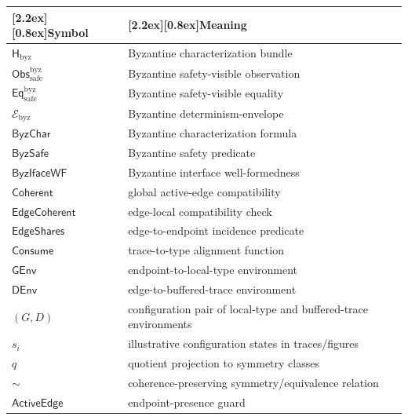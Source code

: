 \documentclass[a4paper,10pt,twocolumn,english]{article}
\numberwithin{equation}{section}
\theoremstyle{paperdef}
\theoremstyle{paperplain}
\theoremstyle{paperdef}
\theoremstyle{paperremark}
\newcommand{\thead}[1]{\textbf{\raisebox{0pt}[2.2ex][0.8ex]{#1}}}
\newcommand{\Coherent}{\ensuremath{\mathsf{Coherent}}}
\newcommand{\EdgeCoherent}{\ensuremath{\mathsf{EdgeCoherent}}}
\newcommand{\ActiveEdge}{\ensuremath{\mathsf{ActiveEdge}}}
\newcommand{\Consume}{\ensuremath{\mathsf{Consume}}}
\newcommand{\GEnv}{\ensuremath{\mathsf{GEnv}}}
\newcommand{\DEnv}{\ensuremath{\mathsf{DEnv}}}
\newcommand{\Hbyz}{\ensuremath{\mathsf{H}_{\mathrm{byz}}}}
\newcommand{\Obssafe}{\ensuremath{\mathsf{Obs}_{\mathrm{safe}}^{\mathrm{byz}}}}
\newcommand{\Eqsafe}{\ensuremath{\mathsf{Eq}_{\mathrm{safe}}^{\mathrm{byz}}}}
\newcommand{\Ebyz}{\ensuremath{\mathcal{E}_{\mathrm{byz}}}}
\newcommand{\ByzSafe}{\ensuremath{\mathsf{ByzSafe}}}
\newcommand{\ByzChar}{\ensuremath{\mathsf{ByzChar}}}
\newcommand{\EdgeShares}{\ensuremath{\mathsf{EdgeShares}}}
\newcommand{\ByzIfaceWF}{\ensuremath{\mathsf{ByzIfaceWF}}}
\begin{document}
\begin{center}
	\small
	\begin{tabularx}{\columnwidth}{@{}L{0.36\columnwidth}L{0.59\columnwidth}@{}}
		\toprule
		\thead{Symbol}  & \thead{Meaning}                                                  \\
		\midrule
		\Hbyz           & Byzantine characterization bundle                                \\
		\Obssafe        & Byzantine safety-visible observation                             \\
		\Eqsafe         & Byzantine safety-visible equality                                \\
		\Ebyz           & Byzantine determinism-envelope                                   \\
		\ByzChar        & Byzantine characterization formula                               \\
		\ByzSafe        & Byzantine safety predicate                                       \\
		\ByzIfaceWF     & Byzantine interface well-formedness                              \\
		\Coherent       & global active-edge compatibility                                 \\
		\EdgeCoherent   & edge-local compatibility check                                   \\
		\EdgeShares     & edge-to-endpoint incidence predicate                             \\
		\Consume        & trace-to-type alignment function                                 \\
		\GEnv           & endpoint-to-local-type environment                               \\
		\DEnv           & edge-to-buffered-trace environment                               \\
		$(G,D)$         & configuration pair of local-type and buffered-trace environments \\
		$s_i$           & illustrative configuration states in traces/figures              \\
		$q$             & quotient projection to symmetry classes                          \\
		$\sim$          & coherence-preserving symmetry/equivalence relation               \\
		\ActiveEdge     & endpoint-presence guard                                          \\

\end{tabularx}
\end{center}
\end{document}
